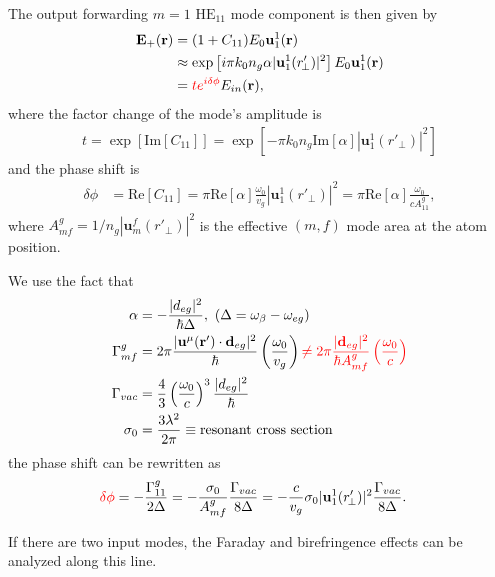 \documentclass[preprint,aps,pra,onecolumn]{revtex4-1} %
\begin{document}
The output forwarding $ m=1 $ $\mathrm{HE}_{11}$ mode component is then given by
\begin{align}
\mathbf{E}_+(\mathbf{r}) &= (1+C_{11})E_0\mathbf{u}_{1}^{1} (\mathbf{r})\\
&\approx \exp\left[i\pi k_0 n_g\alpha  | \mathbf{u}_1^1(r'_{\!\perp})|^2 \right] E_0\mathbf{u}_{1}^{1} (\mathbf{r})\\
&= \mathbin{\color{red}{te^{i\delta\phi}}}E_{in}(\mathbf{r}), 
\end{align}
where the factor change of the mode's amplitude is 
\begin{align}
t=\exp\left[\mathrm{Im}[C_{11}]\right]=\exp\left[ -\pi k_0 n_g \mathrm{Im}[\alpha]  | \mathbf{u}_1^1(r'_{\!\perp})|^2 \right]
\end{align}
and the phase shift is
\begin{align}
\delta\phi &= \mathrm{Re}[C_{11}]= \pi \mathrm{Re}[\alpha] \frac{\omega_0}{v_g}  | \mathbf{u}_1^1(r'_{\!\perp})|^2
= \pi \mathrm{Re}[\alpha] \frac{\omega_0}{cA^g_{11}},
\end{align}
where $ A^g_{mf}=1/n_g| \mathbf{u}_m^f(r'_{\!\perp})|^2 $ is the effective $(m,f)$ mode area at the atom position. 

We use the fact that 
\begin{align}
\alpha &=-\frac{|d_{eg}|^2}{\hbar \Delta}, \,\, (\Delta=\omega_{\beta}-\omega_{eg})\\
\Gamma^{g}_{mf} &= 2\pi \frac{|\mathbf{u}^\mu(\mathbf{r}')\cdot \mathbf{d}_{eg}|^2}{\hbar }\left(\frac{\omega_0}{v_g} \right)\mathbin{\color{red} \neq 2\pi \frac{| \mathbf{d}_{eg}|^2}{\hbar A^g_{mf}}\left(\frac{\omega_0}{c} \right)}\label{eq:Gammagmf}\\
\Gamma_{vac} &= \frac{4}{3} \left( \frac{\omega_0}{c}\right)^3 \frac{|d_{eg}|^2}{\hbar}\\
\sigma_0 &= \frac{3\lambda^2}{2\pi} \equiv \text{resonant cross section}
\end{align}
the phase shift can be rewritten as
\begin{align}
\mathbin{\color{red}{\delta\phi}} &= -\frac{\Gamma^{g}_{11}}{2\Delta} = - \frac{\sigma_0 }{A^g_{mf}} \frac{\Gamma_{vac}}{8\Delta} = -\frac{c}{v_g} \sigma_0 |\mathbf{u}_1^1 (r'_{\!\perp})|^2 \frac{\Gamma_{vac}}{8\Delta}.
\end{align}

If there are two input modes, the Faraday and birefringence effects can be analyzed along this line. 
\end{document}
